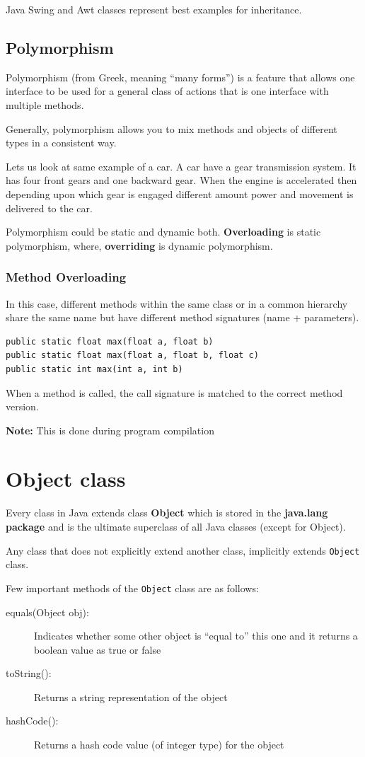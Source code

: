 \documentclass[11pt,a4paper]{article}
\begin{document}
Java Swing and Awt classes represent best examples for inheritance.
\subsection*{Polymorphism}
Polymorphism (from Greek, meaning ``many forms'') is a feature that allows one interface to be used for a general class of actions that is one interface with multiple methods.

Generally, polymorphism allows you to mix methods and objects of different types in a consistent way.

Lets us look at same example of a car. A car have a gear transmission system. It has four front gears and one backward gear. When the engine is accelerated then depending upon which gear is engaged different amount power and movement is delivered to the car.

Polymorphism could be static and dynamic both. \textbf{Overloading} is static polymorphism, where, \textbf{overriding} is dynamic polymorphism.

\subsubsection*{Method Overloading}
In this case, different methods within the same class or in a common hierarchy share the same name but have different method signatures (name + parameters).
\begin{lstlisting}[numbers=none, xleftmargin=.25in]
public static float max(float a, float b)
public static float max(float a, float b, float c)
public static int max(int a, int b)
\end{lstlisting}
When a method is called, the call signature is matched to the correct method version.

\textbf{Note:} This is done during program compilation

\section*{Object class}
Every class in Java extends class \textbf{Object} which is stored in the \textbf{java.lang package} and is the ultimate superclass of all Java classes (except for Object).

Any class that does not explicitly extend another class, implicitly extends \texttt{Object} class.

Few important methods of the \texttt{Object} class are as follows:
\begin{description}
\item [equals(Object obj):]  Indicates whether some other object is ``equal to'' this one and it returns a boolean value as true or false
\item [toString():] Returns a string representation of the object
\item [hashCode():] Returns a hash code value (of integer type) for the object
\end{description}
\end{document}
